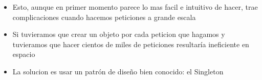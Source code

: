 \begin{itemize}
  \item Esto, aunque en primer momento parece lo mas facil e intuitivo de hacer, trae complicaciones cuando hacemos peticiones a grande escala
  \item Si tuvieramos que crear un objeto por cada peticion que hagamos y tuvieramos que hacer cientos de miles de peticiones resultaría ineficiente en espacio
  \item La solucion es usar un patrón de diseño bien conocido: el Singleton
\end{itemize}

